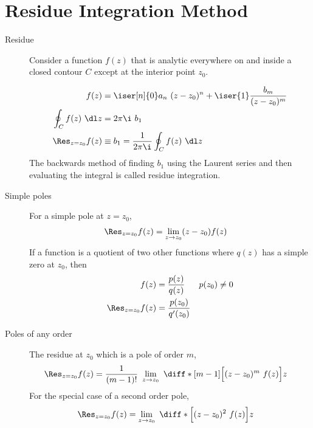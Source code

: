\section{Residue Integration Method}

\begin{description}
    \item[Residue] Consider a function $ f(z) $ that is analytic everywhere on and
        inside a closed contour $ C $ except at the interior point $ z_0 $. \par
        \begin{align}
            f(z)                & = \iser[n]{0} a_n\ (z - z_0)^n
            + \iser{1} \frac{b_m}{(z - z_0)^m}                                      \\
            \oint_C f(z)\ \dl z & = 2\pi\i\ b_1                                     \\
            \Res_{z = z_0} f(z) & \equiv b_1 = \frac{1}{2\pi\i} \oint_C f(z)\ \dl z
        \end{align}
        The backwards method of finding $ b_1 $ using the Laurent series and then
        evaluating the integral is called residue integration.

    \item[Simple poles] For a simple pole at $ z = z_0 $,
        \begin{align}
            \Res_{z = z_0} f(z) & = \lim_{z \to z_0} (z - z_0) f(z)
        \end{align}
        If a function is a quotient of two other functions where $ q(z) $ has a simple
        zero at $ z_0 $, then
        \begin{align}
            f(z)                & = \frac{p(z)}{q(z)}      &
            p(z_0)              & \neq 0                     \\
            \Res_{z = z_0} f(z) & = \frac{p(z_0)}{q'(z_0)}
        \end{align}

    \item[Poles of any order] The residue at $ z_0 $ which is a pole of order $ m $,
        \begin{align}
            \Res_{z = z_0} f(z) & = \frac{1}{(m-1)!}\ \lim_{z \to z_0}
            \ \diff*[m-1] {\Big[(z - z_0)^m\ f(z)\Big]}{z}
        \end{align}
        For the special case of a second order pole,
        \begin{align}
            \Res_{z = z_0} f(z) & = \lim_{z \to z_0}
            \ \diff* {\Big[(z - z_0)^2\ f(z)\Big]}{z}
        \end{align}


\end{description}
